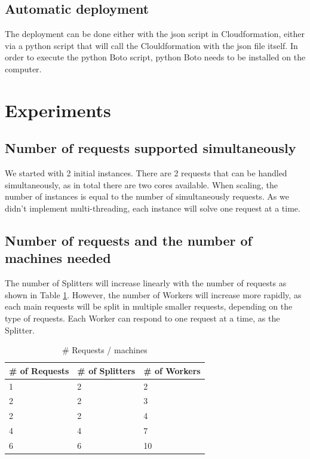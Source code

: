 \documentclass{acm_proc_article-sp}
\begin{document}
\subsection{Automatic deployment}
The deployment can be done either with the json script in Cloudformation, either via a python script that will call the Clouldformation with the json file itself.
In order to execute the python Boto script, python Boto needs to be installed on the computer. 

\section{Experiments}
\subsection{Number of requests supported simultaneously}
We started with 2 initial instances. 
There are 2 requests that can be handled simultaneously, as in total there are two cores available.
When scaling, the number of instances is equal to the number of simultaneously requests.
As we didn't implement multi-threading, each instance will solve one request at a time.\\

\subsection{Number of requests and the number of machines needed}
The number of Splitters will increase linearly with the number of requests as shown in Table \ref{tb:reqMach}. 
However, the number of Workers will increase more rapidly, as each main requests will be split in multiple smaller requests, depending on the type of requests. 
Each Worker can respond to one request at a time, as the Splitter.

\begin{table}
\caption{\# Requests / machines}
\label{tb:reqMach}
\centering
\begin{tabular}{|l|l|l|} \hline
\# of Requests & \# of Splitters & \# of Workers \\\hline\hline
  1 & 2 & 2 \\\hline
  2 & 2 & 3 \\\hline
  2 & 2 & 4 \\\hline
  4 & 4 & 7 \\\hline
  6 & 6 & 10 \\ \hline \end{tabular}
\end{table}
\end{document}
